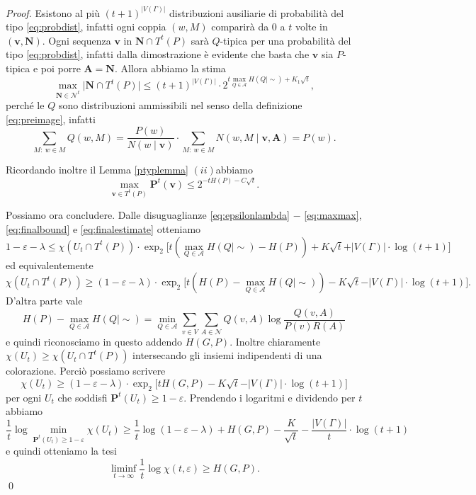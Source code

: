 \begin{proof}
  Esistono al più \((t+1)^{\vert V(\Gamma)\vert}\) distribuzioni ausiliarie di probabilità del tipo \eqref{eq:probdist}, infatti ogni coppia \((w,M)\) comparirà da \(0\) a \(t\) volte in \((\mathbf{v},\mathbf{N})\). Ogni sequenza \(\mathbf{v}\) in \(\mathbf{N}\cap T^{t}(P)\) sarà \(Q\)-tipica per una probabilità del tipo \eqref{eq:probdist}, infatti dalla dimostrazione è evidente che basta che \(\mathbf{v}\) sia \(P\)-tipica e poi porre \(\mathbf{A}=\mathbf{N}\). Allora abbiamo la stima 
  \begin{equation}
    \label{eq:finalbound} \max_{\mathbf{N}\in \mathcal{N}^t} \big\vert \mathbf{N}\cap T^{t}(P) \big\vert \le (t+1)^{\vert V(\Gamma)\vert} \cdot 2^{t\max_{Q\in \mathcal{A}} H(Q\mid\sim)+K_1\sqrt{t}}, 
  \end{equation}
  perché le \(Q\) sono distribuzioni ammissibili nel senso della definizione \eqref{eq:preimage}, infatti
  \[\sum_{M:\ w\in M} Q(w, M)=\frac{P(w)}{N(w\mid \mathbf{v})}\cdot \sum_{M:\ w\in M} N(w,M\mid \mathbf{v}, \mathbf{A})=P(w).\]
  
  Ricordando inoltre il Lemma \ref{ptyplemma} \((ii)\)abbiamo 
  \begin{equation}
    \label{eq:finalestimate} \max_{\mathbf{v}\in T^{t}(P)} \mathbf{P}^t(\mathbf{v}) \le 2^{-tH(P)-C\sqrt{t}}. 
  \end{equation}
  
  Possiamo ora concludere. Dalle disuguaglianze \eqref{eq:epsilonlambda} \(-\) \eqref{eq:maxmax}, \eqref{eq:finalbound} e \eqref{eq:finalestimate} otteniamo
  \[1-\varepsilon-\lambda \le \chi(U_{t}\cap T^t(P))\cdot \exp_{2}{\big[t(\max_{Q\in \mathcal{A}} H(Q\mid\sim)-H(P)) + K\sqrt{t}} + \vert V(\Gamma)\vert\cdot\log{(t+1)} \big]\]
  ed equivalentemente
  \[\chi(U_{t}\cap T^t(P))\ge (1-\varepsilon-\lambda)\cdot \exp_{2}{\big[t(H(P)-\max_{Q\in \mathcal{A}} H(Q\mid\sim)) - K\sqrt{t}} - \vert V(\Gamma)\vert\cdot\log{(t+1)} \big].\]
  D'altra parte vale
  \[H(P)-\max_{Q\in \mathcal{A}} H(Q\mid\sim) = \min_{Q\in \mathcal{A}} \sum_{v\in V}\sum_{A\in \mathcal{N}} Q(v,A)\log{\frac{Q(v,A)}{P(v)R(A)}}\]
  e quindi riconosciamo in questo addendo \(H(G,P)\). Inoltre chiaramente \(\chi(U_{t})\ge\chi(U_{t}\cap T^{t}(P))\) intersecando gli insiemi indipendenti di una colorazione. Perciò possiamo scrivere
  \[\chi(U_{t})\ge (1-\varepsilon-\lambda)\cdot \exp_{2}{\big[tH(G,P) - K\sqrt{t}} - \vert V(\Gamma)\vert\cdot\log{(t+1)} \big]\]
  per ogni \(U_{t}\) che soddisfi \(\mathbf{P}^t(U_{t})\ge 1-\varepsilon\). Prendendo i logaritmi e dividendo per \(t\) abbiamo
  \[\frac{1}{t}\log{\min_{\mathbf{P}^t(U_{t})\ge 1-\varepsilon}} \chi(U_{t})\ge \frac{1}{t}\log{(1-\varepsilon-\lambda)} + H(G,P) - \frac{K}{\sqrt{t}} - \frac{\vert V(\Gamma)\vert}{t}\cdot \log{(t+1)}\]
  e quindi otteniamo la tesi
  \[ \liminf_{t\to \infty} \frac{1}{t}\log\chi(t,\varepsilon)\ge H(G,P). \]
  \qed 
\end{proof}
